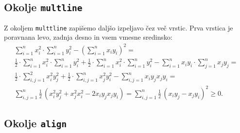\documentclass{amsart}
\begin{document}
\subsection{Okolje \texttt{multline}}

Z okoljem \texttt{multtline} zapišemo daljšo izpeljavo čez več vrstic. Prva vrstica je
poravnana levo, zadnja desno in vsem vmesne sredinsko:
%
\begin{multline*}
  \sum_{i=1}^n x_i^2 \cdot \sum_{i=1}^n y_i^2
  - \left( \sum_{i=1}^n x_i y_i \right)^2 = \\
  \frac{1}{2} \cdot \sum_{i=1}^n x_i^2 \cdot \sum_{i=1}^n y_i^2
  +
  \frac{1}{2} \cdot \sum_{i=1}^n x_i^2 \cdot \sum_{i=1}^n y_i^2
  -
  \sum_{i=1}^n x_i y_i \cdot \sum_{j=1}^n x_j y_j = \\
  \frac{1}{2} \cdot \sum_{i,j=1}^2 x_i^2 y_j^2
  +
  \frac{1}{2} \cdot \sum_{i,j=1}^n x_j^2 y_i^2
  -
  \sum_{i,j=1}^n x_i y_j x_j y_i = \\
  \sum_{i,j=1}^n \frac{1}{2}\,
  \left(
    x_i^2 y_j^2 + x_j^2 x_i^2 - 2 x_i y_j x_j y_i
  \right)
  =
  \sum_{i,j=1}^n \frac{1}{2}\,
  \left(
    x_i y_j - x_j y_i
  \right)^2
  \geq 0.
\end{multline*}


\subsection{Okolje \texttt{align}}
\end{document}
